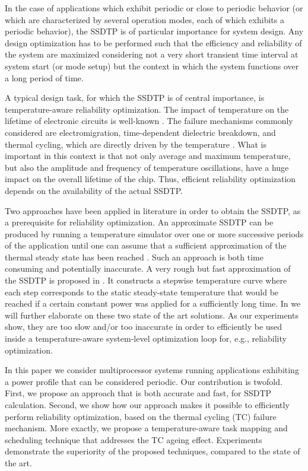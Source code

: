 In the case of applications which exhibit periodic or close to periodic behavior (or which are characterized by several operation modes, each of which exhibits a periodic behavior), the SSDTP is of particular importance for system design. Any design optimization has to be performed such that the efficiency and reliability of the system are maximized considering not a very short transient time interval at system start (or mode setup) but the context in which the system functions over a long period of time.

A typical design task, for which the SSDTP is of central importance, is temperature-aware reliability optimization. The impact of temperature on the lifetime of electronic circuits is well-known \cite{srinivasan2004, coskun2006, xiang2010, jedec2010}. The failure mechanisms commonly considered are electromigration, time-dependent dielectric breakdown, and thermal cycling, which are directly driven by the temperature \cite{jedec2010}. What is important in this context is that not only average and maximum temperature, but also the amplitude and frequency of temperature oscillations, have a huge impact on the overall lifetime of the chip. Thus, efficient reliability optimization depends on the availability of the actual SSDTP.

Two approaches have been applied in literature in order to obtain the SSDTP, as a prerequisite for reliability optimization. An approximate SSDTP can be produced by running a temperature simulator over one or more successive periods of the application until one can assume that a sufficient approximation of the thermal steady state has been reached \cite{srinivasan2004}. Such an approach is both time consuming and potentially inaccurate. A very rough but fast approximation of the SSDTP is proposed in \cite{huang2009}. It constructs a stepwise temperature curve where each step corresponds to the static steady-state temperature that would be reached if a certain constant power was applied for a sufficiently long time. In  we will further elaborate on these two state of the art solutions. As our experiments show, they are too slow and/or too inaccurate in order to efficiently be used inside a temperature-aware system-level optimization loop for, e.g., reliability optimization.

In this paper we consider multiprocessor systems running applications exhibiting a power profile that can be considered periodic. Our contribution is twofold. First, we propose an approach that is both accurate and fast, for SSDTP calculation. Second, we show how our approach makes it possible to efficiently perform reliability optimization, based on the thermal cycling (TC) failure mechanism. More exactly, we propose a temperature-aware task mapping and scheduling technique that addresses the TC ageing effect. Experiments demonstrate the superiority of the proposed techniques, compared to the state of the art.

